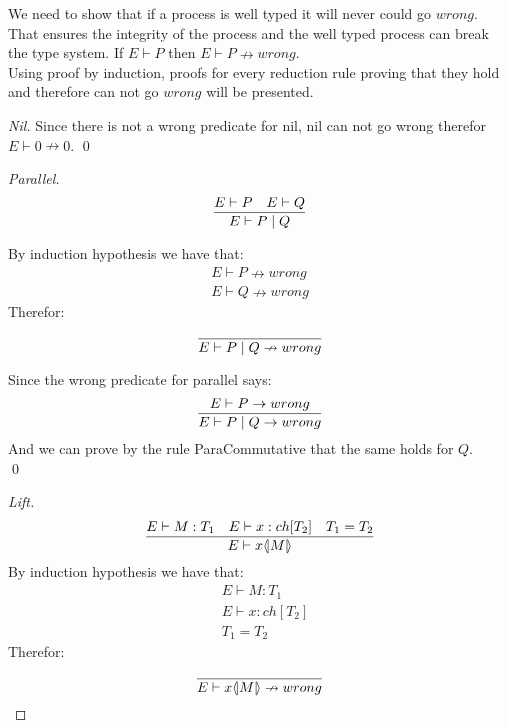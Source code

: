 \begin{theorem}
We need to show that if a process is well typed it will never could go \ensuremath{wrong}. That ensures the integrity of the process and the well typed process can break the type system.
    If \ensuremath{E \vdash P} then \ensuremath{E \vdash P \nrightarrow wrong}.\\
    Using proof by induction, proofs for every reduction rule proving that they hold and therefore can not go \ensuremath{wrong} will be presented.

    \begin{proof}[Nil]
        Since there is not a wrong predicate for nil, nil can not go wrong therefor \ensuremath{E \vdash 0 \nrightarrow 0}.
        \qed
    \end{proof}

    \begin{proof}[Parallel]
        \begin{align*}
            \frac{E \vdash P \quad E \vdash Q }{E \vdash P \mid Q}
        \end{align*}

        By induction hypothesis we have that: 
        \begin{align*}
            E \vdash P \nrightarrow wrong\\
            E \vdash Q \nrightarrow wrong
        \end{align*}
        Therefor:
        \begin{align*}
            \frac{}{E \vdash P \mid Q \nrightarrow wrong}
        \end{align*}

        Since the wrong predicate for parallel says:
        \begin{align*}
            \frac{E \vdash P \rightarrow wrong}{E \vdash P \mid Q \rightarrow wrong}
        \end{align*}
        And we can prove by the rule ParaCommutative that the same holds for \ensuremath{Q}.\\
        \qed
    \end{proof}

    \begin{proof}[Lift]
        \begin{align*}
            \frac{E \vdash M:T_1 \quad E \vdash x:ch[T_2] \quad T_1 = T_2}{E \vdash x \langle \! | M | \! \rangle}
        \end{align*}
        By induction hypothesis we have that:
        \begin{align*}
            &E \vdash M:T_1\\
            &E \vdash x:ch[T_2]\\
            &T_1 = T_2
        \end{align*}
        Therefor:
        \begin{align*}
            \frac{}{E \vdash x \langle \! | M | \! \rangle \nrightarrow wrong}
        \end{align*}


\end{proof}
\end{theorem}
